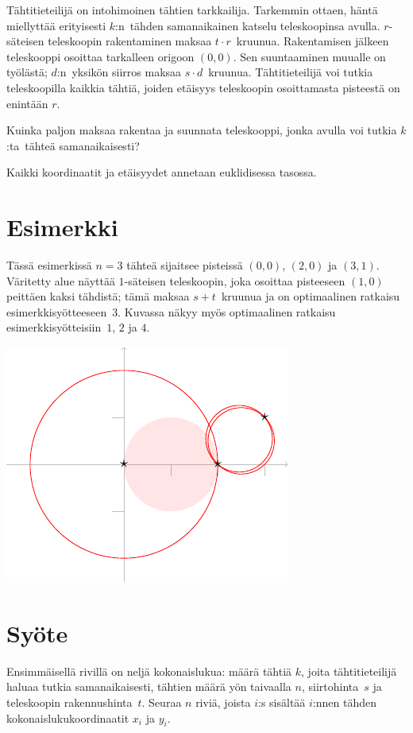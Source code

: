 
\noindent
Tähtitieteilijä on intohimoinen tähtien tarkkailija.
Tarkemmin ottaen, häntä miellyttää erityisesti $k$:n~tähden samanaikainen katselu teleskoopinsa avulla.
$r$-säteisen teleskoopin rakentaminen maksaa $t\cdot r$~kruunua.
Rakentamisen jälkeen teleskooppi osoittaa tarkalleen origoon $(0,0)$.
Sen suuntaaminen muualle on työlästä;
$d$:n~yksikön siirros maksaa $s\cdot d$~kruunua.
Tähtitieteilijä voi tutkia teleskoopilla kaikkia tähtiä, joiden etäisyys teleskoopin osoittamasta pisteestä on enintään $r$.

Kuinka paljon maksaa rakentaa ja suunnata teleskooppi, jonka avulla voi tutkia $k$:ta~tähteä samanaikaisesti?

\medskip

Kaikki koordinaatit ja etäisyydet annetaan euklidisessa tasossa.


\section*{Esimerkki}

Tässä esimerkissä $n=3$ tähteä sijaitsee pisteissä $(0,0)$, $(2,0)$ ja $(3,1)$.
Väritetty alue näyttää $1$-säteisen teleskoopin, joka osoittaa pisteeseen $(1,0)$ peittäen kaksi tähdistä; tämä maksaa $s + t$~kruunua ja on optimaalinen ratkaisu esimerkkisyötteeseen~$3$.
Kuvassa näkyy myös optimaalinen ratkaisu esimerkkisyötteisiin~$1$, $2$ ja $4$.

\medskip
\noindent
\includegraphics[width=.3\textwidth]{img/samples.pdf}


\section*{Syöte}

Ensimmäisellä rivillä on neljä kokonaislukua:
määrä tähtiä $k$, joita tähtitieteilijä haluaa tutkia samanaikaisesti,
tähtien määrä yön taivaalla $n$,
siirtohinta~$s$
ja
teleskoopin rakennushinta~$t$.
Seuraa $n$ riviä,
joista $i$:s sisältää $i$:nnen tähden kokonaislukukoordinaatit $x_i$ ja $y_i$.

